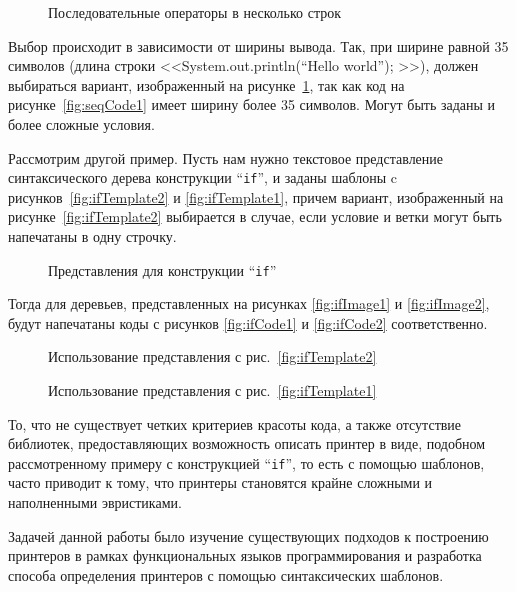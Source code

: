 \begin{figure}[h!]
	\centering
	
	\caption{Последовательные операторы в несколько строк}
	\label{fig:seqCode2}
\end{figure}

Выбор происходит в зависимости от ширины вывода. Так, при ширине равной 35 символов (длина строки <<System.out.println(“Hello world”); >>), должен выбираться вариант, изображенный на рисунке~\ref{fig:seqCode2}, так как код на рисунке~\ref{fig:seqCode1} имеет ширину более 35 символов.
Могут быть заданы и более сложные условия.

Рассмотрим другой пример. Пусть нам нужно текстовое представление синтаксического дерева конструкции “\lstinline{if}”, и заданы шаблоны c рисунков~\ref{fig:ifTemplate2} и \ref{fig:ifTemplate1}, причем вариант, изображенный на рисунке~\ref{fig:ifTemplate2} выбирается в случае, если условие и ветки могут быть напечатаны в одну строчку.

\begin{figure}[h!]
	\subfloat[]{
		
		\label{fig:ifTemplate2}	
	}
	\quad
	\subfloat[]{
		
		\label{fig:ifTemplate1}	
	}
	\caption{Представления для конструкции “\lstinline{if}”}
\end{figure}


Тогда для деревьев, представленных на рисунках \ref{fig:ifImage1} и \ref{fig:ifImage2}, будут напечатаны коды с рисунков \ref{fig:ifCode1} и \ref{fig:ifCode2} соответственно.

\begin{figure}[h!]
	\subfloat[]{
		\centering
		\texttt{[image: if1]}
		\label{fig:ifImage1}
	}
	\quad
	\subfloat[]{
		\centering
		
		\label{fig:ifCode1}	
	}

	\caption{Использование представления с рис.~\ref{fig:ifTemplate2}}
\end{figure}

\begin{figure}[h!]
	\subfloat[]{
		\centering
		\texttt{[image: if2]}
		\label{fig:ifImage2}	
	}
	\quad
	\subfloat[]{
		\centering
		
		\label{fig:ifCode2}	
	}

	\caption{Использование представления с рис.~\ref{fig:ifTemplate1}}
\end{figure}

То, что не существует четких критериев красоты кода, а также отсутствие библиотек, предоставляющих возможность описать принтер в виде, подобном
рассмотренному примеру с конструкцией “\lstinline{if}”, то есть с помощью шаблонов, часто приводит к тому, что принтеры становятся крайне сложными и наполненными эвристиками.

Задачей данной работы было изучение существующих подходов к построению принтеров в рамках функциональных языков программирования и разработка способа определения принтеров с помощью синтаксических шаблонов.